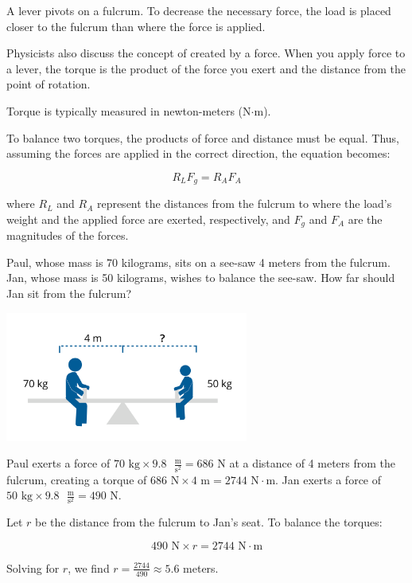 A lever pivots on a fulcrum. To decrease the necessary force, the load is placed 
closer to the fulcrum than where the force is applied.

Physicists also discuss the concept of  created by a force. When 
you apply force to a lever, the torque is the product of the force you exert and 
the distance from the point of rotation.

Torque is typically measured in newton-meters (N$\cdot$m).

To balance two torques, the products of force and distance must be equal. Thus, 
assuming the forces are applied in the correct direction, the equation becomes:

\[
R_L F_g = R_A F_A
\]

where \( R_L \) and \( R_A \) represent the distances from the fulcrum to where 
the load’s weight and the applied force are exerted, respectively, and \( F_g \) 
and \( F_A \) are the magnitudes of the forces.


\begin{Exercise}[title={Lever}, label=lever]
Paul, whose mass is 70 kilograms, sits on a see-saw 4 meters from the fulcrum. 
Jan, whose mass is 50 kilograms, wishes to balance the see-saw. How far should 
Jan sit from the fulcrum?

\begin{center}
\includegraphics[width=0.6\textwidth]{seesaw.png}
\end{center}

\end{Exercise}
\begin{Answer}[ref=lever]
Paul exerts a force of \( 70 \text{ kg} \times 9.8 \text{ } \frac{\text{m}}{
\text{s}^2} = 686 \text{ N}\) at a distance of 4 meters from the fulcrum, 
creating a torque of \( 686 \text{ N}\times 4 \text{ m} = 2744 \text{ N} \cdot 
\text{m} \). Jan exerts a force of \( 50 \text{ kg} \times 9.8 \text{ } \frac{
\text{m}}{\text{s}^2}= 490 \text{ N}\).

Let \( r \) be the distance from the fulcrum to Jan's seat. To balance the torques:

\[
490 \text{ N}\times r = 2744 \text{ N} \cdot \text{m}
\]

Solving for \( r \), we find \( r = \frac{2744}{490} \approx 5.6 \) meters.
\end{Answer}

